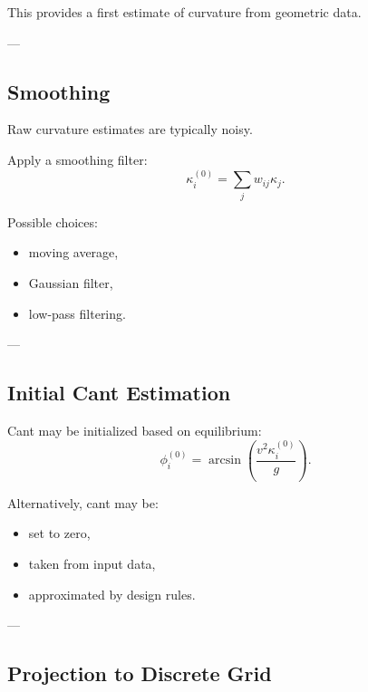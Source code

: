 \begin{remark}
This provides a first estimate of curvature from geometric data.
\end{remark}

---

\subsection{Smoothing}

\begin{remark}
Raw curvature estimates are typically noisy.
\end{remark}

\begin{definition}
Apply a smoothing filter:
\[
\kappa_i^{(0)}
=
\sum_j w_{ij} \kappa_j.
\]
\end{definition}

\begin{remark}
Possible choices:
\begin{itemize}
\item moving average,
\item Gaussian filter,
\item low-pass filtering.
\end{itemize}
\end{remark}

---

\subsection{Initial Cant Estimation}

\begin{remark}
Cant may be initialized based on equilibrium:
\[
\phi_i^{(0)}
=
\arcsin\left(\frac{v^2 \kappa_i^{(0)}}{g}\right).
\]
\end{remark}

\begin{remark}
Alternatively, cant may be:
\begin{itemize}
\item set to zero,
\item taken from input data,
\item approximated by design rules.
\end{itemize}
\end{remark}

---

\subsection{Projection to Discrete Grid}

